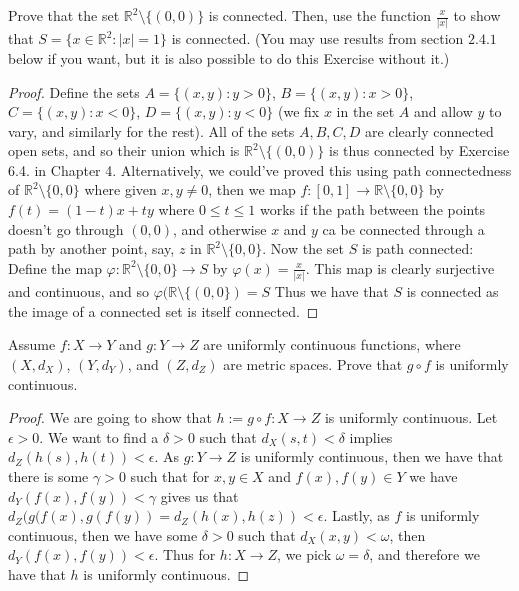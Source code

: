 \documentclass[oneside]{amsart}
\theoremstyle{definition}
\newcommand{\rr}{\mathbb R}
\begin{document}
\begin{tcolorbox}[colback=black!5!white,colframe=black!75!black,title= Chapter $5$; $\S 2.3$: Exercise $2.7.$] Prove that the set $\rr^2 \setminus \{(0, 0)\}$ is connected. Then, use the function $\frac{x}{|x|}$ to show that $S = \{x \in \rr^2 : |x| = 1\}$ is connected. (You may use results from section $2.4.1$ below if you want, but it is also possible to do this Exercise without it.)
\tcblower 
\begin{proof}  Define the sets $A = \{(x,y) \colon y >0\}$, $B = \{ (x,y) \colon x > 0 \}$, $C = \{ (x,y) \colon x< 0 \}$, $D = \{ (x,y) \colon y< 0 \}$ (we fix $x$ in the set $A$ and allow $y$ to vary, and similarly for the rest). All of the sets $A, B, C, D$ are clearly connected open sets, and so their union which is $\rr^2 \setminus \{ (0, 0) \}$ is thus connected by Exercise 6.4. in Chapter 4. Alternatively, we could've proved this using path connectedness of $\rr^2 \setminus \{ 0, 0\}$ where given $x,y \neq 0$, then we map $f\colon [0,1] \to \rr \setminus \{ 0 , 0\}$ by $f(t) = (1-t)x+ty$ where $0 \leq  t \leq 1$ works if the path between the points doesn't go through $(0,0)$, and otherwise $x$ and $y$ ca be connected through a path by another point, say, $z$ in $\rr^2 \setminus \{0,0\}$. Now the set $S$ is path connected: Define the map $\varphi \colon \rr^2 \setminus \{0, 0 \} \to S$ by $\varphi (x) = \frac{x}{|x|}$. This map is clearly surjective and continuous, and so $\varphi (\rr \setminus \{ (0,0\} )= S $ Thus we have that $S$ is connected as the image of a connected set is itself connected. 
\end{proof}
\end{tcolorbox}

\begin{tcolorbox}[colback=black!5!white,colframe=black!75!black,title= Chapter $5$; $\S 2.3$: Exercise $2.8.$] Assume $f \colon X \to Y$ and $g \colon Y \to  Z$ are uniformly continuous functions, where $(X, d_X )$, $(Y, d_Y)$, and $(Z, d_Z )$ are metric spaces. Prove that $g \circ f$ is uniformly continuous.
\tcblower 
\begin{proof}  We are going to show that $h := g\circ f \colon X \to Z$ is uniformly continuous. Let $\epsilon > 0$. We want to find a $\delta > 0$ such that $d_X(s,t) < \delta$ implies $d_Z(h(s), h(t)) < \epsilon$. As $g \colon Y \to Z$ is uniformly continuous, then we have that there is some $\gamma > 0$ such that for $x, y \in X$ and $f(x), f(y) \in Y$ we have $ d_Y(f(x), f(y)) < \gamma $ gives us that $d_Z(g(f(x), g(f(y)) = d_Z(h(x), h(z))< \epsilon$. Lastly, as $f$ is uniformly continuous, then we have some $\delta > 0$ such that $d_X(x,y)< \omega $, then $d_Y(f(x), f(y))<\epsilon$. Thus for $h \colon X \to Z$, we pick $\omega = \delta$, and therefore we have that $h$ is uniformly continuous. 
\end{proof}
\end{tcolorbox}
\end{document}
